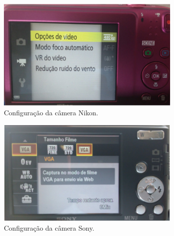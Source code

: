 \begin{figure}[h!]
\begin{center}
\includegraphics[width=9cm]{fig/cameraNikon.png}
\caption{\label{fig:nikon} Configuração da câmera Nikon.}
\vspace{-0.5cm}
\end{center}
\end{figure}

\begin{figure}[h!]
\begin{center}
\includegraphics[width=9cm]{fig/cameraSony.png}
\caption{\label{fig:sony} Configuração da câmera Sony.}
\vspace{-0.5cm}
\end{center}
\end{figure}
\newpage
